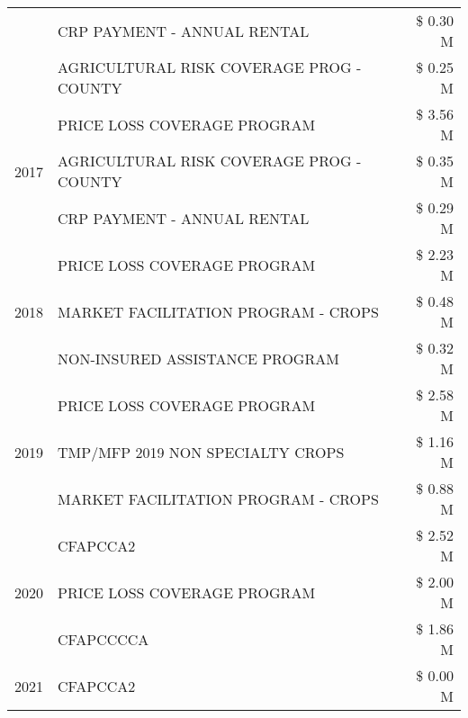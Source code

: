 \begin{tabular}{llr}
 & CRP PAYMENT - ANNUAL RENTAL                   & \$ 0.30 M \\
 & AGRICULTURAL RISK COVERAGE PROG - COUNTY      & \$ 0.25 M \\
\cline{1-3}
\multirow[t]{3}{*}{2017} & PRICE LOSS COVERAGE PROGRAM & \$ 3.56 M \\
 & AGRICULTURAL RISK COVERAGE PROG - COUNTY & \$ 0.35 M \\
 & CRP PAYMENT - ANNUAL RENTAL & \$ 0.29 M \\
\cline{1-3}
\multirow[t]{3}{*}{2018} & PRICE LOSS COVERAGE PROGRAM & \$ 2.23 M \\
 & MARKET FACILITATION PROGRAM - CROPS & \$ 0.48 M \\
 & NON-INSURED ASSISTANCE PROGRAM & \$ 0.32 M \\
\cline{1-3}
\multirow[t]{3}{*}{2019} & PRICE LOSS COVERAGE PROGRAM & \$ 2.58 M \\
 & TMP/MFP 2019 NON SPECIALTY CROPS & \$ 1.16 M \\
 & MARKET FACILITATION PROGRAM - CROPS & \$ 0.88 M \\
\cline{1-3}
\multirow[t]{3}{*}{2020} & CFAPCCA2 & \$ 2.52 M \\
 & PRICE LOSS COVERAGE PROGRAM & \$ 2.00 M \\
 & CFAPCCCCA & \$ 1.86 M \\
\cline{1-3}
2021 & CFAPCCA2 & \$ 0.00 M \\
\cline{1-3}
\bottomrule
\end{tabular}
